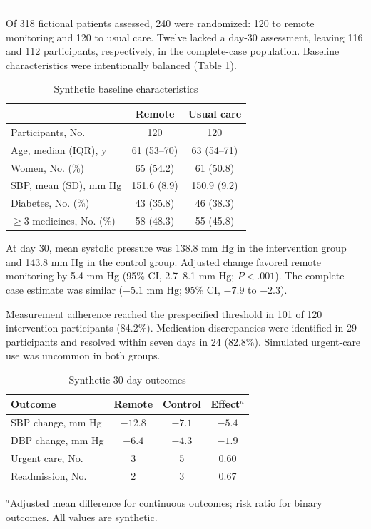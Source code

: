 \documentclass[9pt,twocolumn]{article}
\newcommand{\articleSection}[1]{%
  \par\vspace{5pt}%
  \noindent{\large\bfseries\color{journalblue}#1}\par\vspace{1pt}%
  \noindent\textcolor{journalblue}{\rule{\columnwidth}{0.45pt}}\par\vspace{2pt}%
}
\newcommand{\subsectiontitle}[1]{\vspace{3pt}{\bfseries #1}\par}
\begin{document}
\articleSection{Results}

\subsectiontitle{Participants}
Of 318 fictional patients assessed, 240 were randomized: 120 to remote monitoring and 120 to usual care. Twelve lacked a day-30 assessment, leaving 116 and 112 participants, respectively, in the complete-case population. Baseline characteristics were intentionally balanced (Table 1).

\begin{table}[h]
\centering
\caption{Synthetic baseline characteristics}
\scriptsize
\begin{tabular}{@{}p{2.55cm}cc@{}}
\toprule
 & Remote & Usual care \\
\midrule
Participants, No. & 120 & 120 \\
Age, median (IQR), y & 61 (53--70) & 63 (54--71) \\
Women, No. (\%) & 65 (54.2) & 61 (50.8) \\
SBP, mean (SD), mm Hg & 151.6 (8.9) & 150.9 (9.2) \\
Diabetes, No. (\%) & 43 (35.8) & 46 (38.3) \\
$\geq$3 medicines, No. (\%) & 58 (48.3) & 55 (45.8) \\
\bottomrule
\end{tabular}
\end{table}

\subsectiontitle{Primary and secondary outcomes}
At day 30, mean systolic pressure was 138.8 mm Hg in the intervention group and 143.8 mm Hg in the control group. Adjusted change favored remote monitoring by 5.4 mm Hg (95\% CI, 2.7--8.1 mm Hg; $P<.001$). The complete-case estimate was similar ($-5.1$ mm Hg; 95\% CI, $-7.9$ to $-2.3$).

Measurement adherence reached the prespecified threshold in 101 of 120 intervention participants (84.2\%). Medication discrepancies were identified in 29 participants and resolved within seven days in 24 (82.8\%). Simulated urgent-care use was uncommon in both groups.

\begin{table}[h]
\centering
\caption{Synthetic 30-day outcomes}
\scriptsize
\begin{tabular}{@{}p{2.35cm}ccc@{}}
\toprule
Outcome & Remote & Control & Effect$^{a}$ \\
\midrule
SBP change, mm Hg & $-12.8$ & $-7.1$ & $-5.4$ \\
DBP change, mm Hg & $-6.4$ & $-4.3$ & $-1.9$ \\
Urgent care, No. & 3 & 5 & 0.60 \\
Readmission, No. & 2 & 3 & 0.67 \\
\bottomrule
\end{tabular}
\parbox{0.98\columnwidth}{\tiny $^{a}$Adjusted mean difference for continuous outcomes; risk ratio for binary outcomes. All values are synthetic.}
\end{table}
\end{document}
